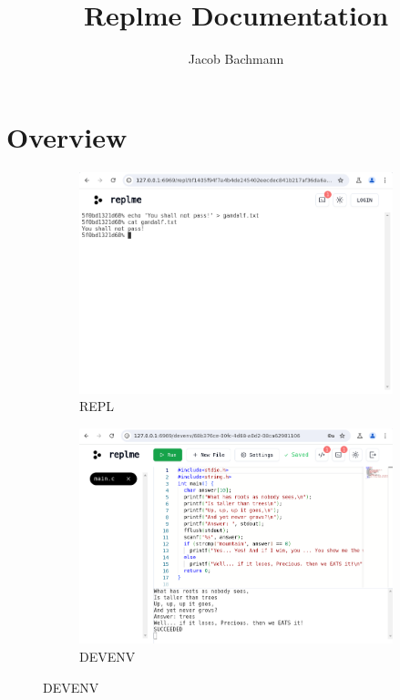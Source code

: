 \documentclass[10pt]{article}
\title{Replme Documentation}
\author{Jacob Bachmann}
\date{ }
\begin{document}
\maketitle

\tableofcontents

\section{Overview}

\begin{figure}
	\centering
	\begin{subfigure}{0.478\textwidth}
		\centering
		\includegraphics[width = \textwidth]{src/repl}
		\caption{REPL}
	\end{subfigure}
	\begin{subfigure}{0.49\textwidth}
		\centering
		\includegraphics[width = \textwidth]{src/devenv}
		\caption{DEVENV}
	\end{subfigure}
\end{figure}
\end{document}
